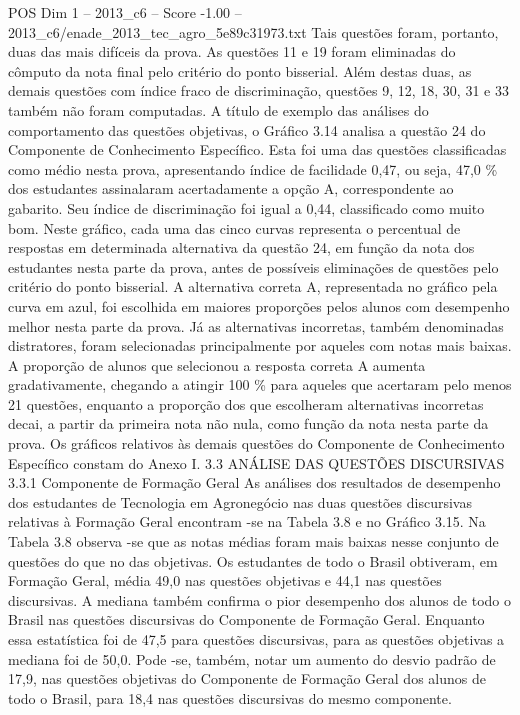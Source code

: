 \begin{textsample}{POS Dim 1 – 2013\_c6 – Score -1.00 – 2013\_c6/enade\_2013\_tec\_agro\_5e89c31973.txt}
Tais questões foram, portanto, duas das mais difíceis da prova.
As questões 11 e 19 foram eliminadas do cômputo da nota final pelo critério do ponto bisserial.
Além destas duas, as demais questões com índice fraco de discriminação, questões 9, 12, 18, 30, 31 e 33 também não foram computadas.
A título de exemplo das análises do comportamento das questões objetivas, o Gráfico 3.14 analisa a questão 24 do Componente de Conhecimento Específico.
Esta foi uma das questões classificadas como médio nesta prova, apresentando índice de facilidade 0,47, ou seja, 47,0 \% dos estudantes assinalaram acertadamente a opção A, correspondente ao gabarito.
Seu índice de discriminação foi igual a 0,44, classificado como muito bom.
Neste gráfico, cada uma das cinco curvas representa o percentual de respostas em determinada alternativa da questão 24, em função da nota dos estudantes nesta parte da prova, antes de possíveis eliminações de questões pelo critério do ponto bisserial.
A alternativa correta A, representada no gráfico pela curva em azul, foi escolhida em maiores proporções pelos alunos com desempenho melhor nesta parte da prova.
Já as alternativas incorretas, também denominadas distratores, foram selecionadas principalmente por aqueles com notas mais baixas.
A proporção de alunos que selecionou a resposta correta A aumenta gradativamente, chegando a atingir 100 \% para aqueles que acertaram pelo menos 21 questões, enquanto a proporção dos que escolheram alternativas incorretas decai, a partir da primeira nota não nula, como função da nota nesta parte da prova.
Os gráficos relativos às demais questões do Componente de Conhecimento Específico constam do Anexo I. 3.3 ANÁLISE DAS QUESTÕES DISCURSIVAS 3.3.1 Componente de Formação Geral As análises dos resultados de desempenho dos estudantes de Tecnologia em Agronegócio nas duas questões discursivas relativas à Formação Geral encontram -se na Tabela 3.8 e no Gráfico 3.15.
Na Tabela 3.8 observa -se que as notas médias foram mais baixas nesse conjunto de questões do que no das objetivas.
Os estudantes de todo o Brasil obtiveram, em Formação Geral, média 49,0 nas questões objetivas e 44,1 nas questões discursivas.
A mediana também confirma o pior desempenho dos alunos de todo o Brasil nas questões discursivas do Componente de Formação Geral.
Enquanto essa estatística foi de 47,5 para questões discursivas, para as questões objetivas a mediana foi de 50,0.
Pode -se, também, notar um aumento do desvio padrão de 17,9, nas questões objetivas do Componente de Formação Geral dos alunos de todo o Brasil, para 18,4 nas questões discursivas do mesmo componente.

\end{textsample}
